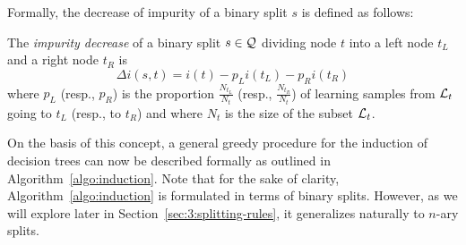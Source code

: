 Formally, the decrease of impurity of a binary split $s$ is defined as follows:
\begin{definition}\label{def:impurity-decrease}
The \emph{impurity decrease} of a binary split $s \in {\cal Q}$ dividing node $t$ into
a left node $t_L$ and a right node $t_R$ is
\begin{equation}
\Delta i(s, t) = i(t) - p_L i(t_L) - p_R i(t_R)
\end{equation}
where $p_L$ (resp., $p_R$) is the proportion $\tfrac{N_{t_L}}{N_t}$ (resp., $\tfrac{N_{t_R}}{N_t}$)
of learning samples from ${\cal L}_t$ going to $t_L$ (resp., to $t_R$) and where $N_t$
is the size of the subset ${\cal L}_t$.
\end{definition}

On the basis of this concept, a general greedy procedure for the induction of
decision trees can now be described formally as outlined in
Algorithm~\ref{algo:induction}. Note that for the sake of clarity,
Algorithm~\ref{algo:induction} is formulated in terms of binary splits.
However, as we will explore later in Section~\ref{sec:3:splitting-rules}, it
generalizes naturally to $n$-ary splits.


